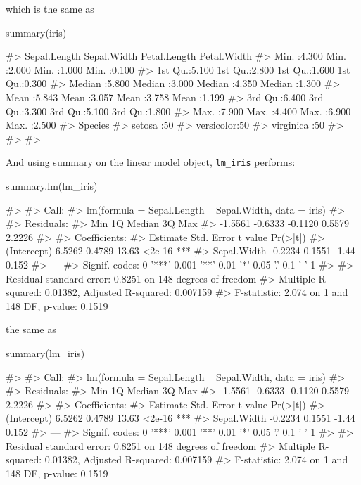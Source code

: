 which is the same as

\begin{Schunk}
\begin{Sinput}
summary(iris)
\end{Sinput}
\begin{Soutput}
#>   Sepal.Length    Sepal.Width     Petal.Length    Petal.Width   
#>  Min.   :4.300   Min.   :2.000   Min.   :1.000   Min.   :0.100  
#>  1st Qu.:5.100   1st Qu.:2.800   1st Qu.:1.600   1st Qu.:0.300  
#>  Median :5.800   Median :3.000   Median :4.350   Median :1.300  
#>  Mean   :5.843   Mean   :3.057   Mean   :3.758   Mean   :1.199  
#>  3rd Qu.:6.400   3rd Qu.:3.300   3rd Qu.:5.100   3rd Qu.:1.800  
#>  Max.   :7.900   Max.   :4.400   Max.   :6.900   Max.   :2.500  
#>        Species  
#>  setosa    :50  
#>  versicolor:50  
#>  virginica :50  
#>                 
#>                 
#> 
\end{Soutput}
\end{Schunk}

And using summary on the linear model object, \texttt{lm\_iris}
performs:

\begin{Schunk}
\begin{Sinput}
summary.lm(lm_iris)
\end{Sinput}
\begin{Soutput}
#> 
#> Call:
#> lm(formula = Sepal.Length ~ Sepal.Width, data = iris)
#> 
#> Residuals:
#>     Min      1Q  Median      3Q     Max 
#> -1.5561 -0.6333 -0.1120  0.5579  2.2226 
#> 
#> Coefficients:
#>             Estimate Std. Error t value Pr(>|t|)    
#> (Intercept)   6.5262     0.4789   13.63   <2e-16 ***
#> Sepal.Width  -0.2234     0.1551   -1.44    0.152    
#> ---
#> Signif. codes:  0 '***' 0.001 '**' 0.01 '*' 0.05 '.' 0.1 ' ' 1
#> 
#> Residual standard error: 0.8251 on 148 degrees of freedom
#> Multiple R-squared:  0.01382,    Adjusted R-squared:  0.007159 
#> F-statistic: 2.074 on 1 and 148 DF,  p-value: 0.1519
\end{Soutput}
\end{Schunk}

the same as

\begin{Schunk}
\begin{Sinput}
summary(lm_iris)
\end{Sinput}
\begin{Soutput}
#> 
#> Call:
#> lm(formula = Sepal.Length ~ Sepal.Width, data = iris)
#> 
#> Residuals:
#>     Min      1Q  Median      3Q     Max 
#> -1.5561 -0.6333 -0.1120  0.5579  2.2226 
#> 
#> Coefficients:
#>             Estimate Std. Error t value Pr(>|t|)    
#> (Intercept)   6.5262     0.4789   13.63   <2e-16 ***
#> Sepal.Width  -0.2234     0.1551   -1.44    0.152    
#> ---
#> Signif. codes:  0 '***' 0.001 '**' 0.01 '*' 0.05 '.' 0.1 ' ' 1
#> 
#> Residual standard error: 0.8251 on 148 degrees of freedom
#> Multiple R-squared:  0.01382,    Adjusted R-squared:  0.007159 
#> F-statistic: 2.074 on 1 and 148 DF,  p-value: 0.1519
\end{Soutput}
\end{Schunk}

